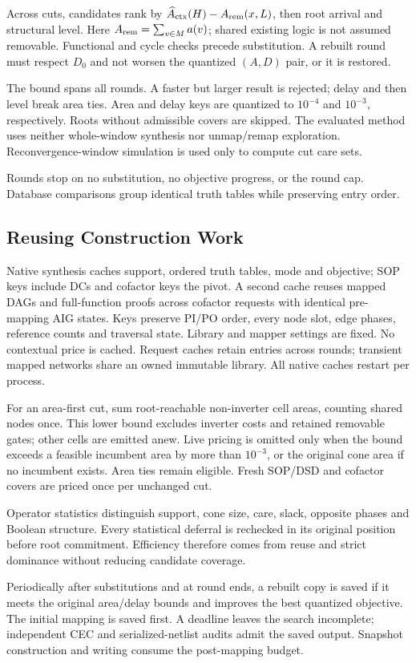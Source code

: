 Across cuts, candidates rank by $\widehat A_{\rm ctx}(H)-A_{\rm rem}(x,L)$, then root arrival and structural level. Here $A_{\rm rem}=\sum_{v\in M}a(v)$; shared existing logic is not assumed removable. Functional and cycle checks precede substitution. A rebuilt round must respect $D_0$ and not worsen the quantized $(A,D)$ pair, or it is restored.

The bound spans all rounds. A faster but larger result is rejected; delay and then level break area ties. Area and delay keys are quantized to $10^{-4}$ and $10^{-3}$, respectively. Roots without admissible covers are skipped. The evaluated method uses neither whole-window synthesis nor unmap/remap exploration. Reconvergence-window simulation is used only to compute cut care sets.

Rounds stop on no substitution, no objective progress, or the round cap. Database comparisons group identical truth tables while preserving entry order.

\subsection{Reusing Construction Work}\label{sec:buildreuse}
Native synthesis caches support, ordered truth tables, mode and objective; SOP keys include DCs and cofactor keys the pivot. A second cache reuses mapped DAGs and full-function proofs across cofactor requests with identical pre-mapping AIG states. Keys preserve PI/PO order, every node slot, edge phases, reference counts and traversal state. Library and mapper settings are fixed. No contextual price is cached. Request caches retain entries across rounds; transient mapped networks share an owned immutable library. All native caches restart per process.

For an area-first cut, sum root-reachable non-inverter cell areas, counting shared nodes once. This lower bound excludes inverter costs and retained removable gates; other cells are emitted anew. Live pricing is omitted only when the bound exceeds a feasible incumbent area by more than $10^{-3}$, or the original cone area if no incumbent exists. Area ties remain eligible. Fresh SOP/DSD and cofactor covers are priced once per unchanged cut.

Operator statistics distinguish support, cone size, care, slack, opposite phases and Boolean structure. Every statistical deferral is rechecked in its original position before root commitment. Efficiency therefore comes from reuse and strict dominance without reducing candidate coverage.

Periodically after substitutions and at round ends, a rebuilt copy is saved if it meets the original area/delay bounds and improves the best quantized objective. The initial mapping is saved first. A deadline leaves the search incomplete; independent CEC and serialized-netlist audits admit the saved output. Snapshot construction and writing consume the post-mapping budget.
